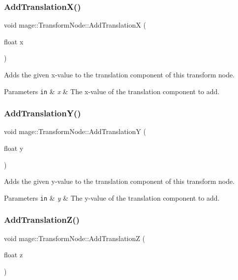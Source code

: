 \subsubsection{\texorpdfstring{Add\+Translation\+X()}{AddTranslationX()}}
{\footnotesize\ttfamily void mage\+::\+Transform\+Node\+::\+Add\+TranslationX (\begin{DoxyParamCaption}\item[{float}]{x }\end{DoxyParamCaption})}

Adds the given x-\/value to the translation component of this transform node.


\begin{DoxyParams}[1]{Parameters}
\mbox{\tt in}  & {\em x} & The x-\/value of the translation component to add. \\
\hline
\end{DoxyParams}
\hypertarget{classmage_1_1_transform_node_a84c2addddb05b0275a5d4150f343dd11}{}\label{classmage_1_1_transform_node_a84c2addddb05b0275a5d4150f343dd11} 
\subsubsection{\texorpdfstring{Add\+Translation\+Y()}{AddTranslationY()}}
{\footnotesize\ttfamily void mage\+::\+Transform\+Node\+::\+Add\+TranslationY (\begin{DoxyParamCaption}\item[{float}]{y }\end{DoxyParamCaption})}

Adds the given y-\/value to the translation component of this transform node.


\begin{DoxyParams}[1]{Parameters}
\mbox{\tt in}  & {\em y} & The y-\/value of the translation component to add. \\
\hline
\end{DoxyParams}
\hypertarget{classmage_1_1_transform_node_a19aeee4f27b1af94d1626ae19dfe12b2}{}\label{classmage_1_1_transform_node_a19aeee4f27b1af94d1626ae19dfe12b2} 
\subsubsection{\texorpdfstring{Add\+Translation\+Z()}{AddTranslationZ()}}
{\footnotesize\ttfamily void mage\+::\+Transform\+Node\+::\+Add\+TranslationZ (\begin{DoxyParamCaption}\item[{float}]{z }\end{DoxyParamCaption})}

